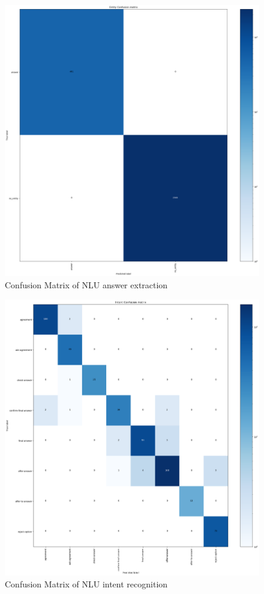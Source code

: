 \documentclass[hidelinks, 11pt]{article}
\begin{document}
\begin{figure}
  \includegraphics[width=\columnwidth]{../Rasa/Evaluation/Clean_Model/DIETClassifier_confusion_matrix.png}
  \caption{Confusion Matrix of NLU answer extraction}
  \label{fig:cm_answer_extraction}
\end{figure}

\begin{figure}
  \includegraphics[width=\columnwidth]{../Rasa/Evaluation/Clean_Model/intent_confusion_matrix.png}
  \caption{Confusion Matrix of NLU intent recognition}
  \label{fig:cm_intent_recognition}
\end{figure}
\end{document}

